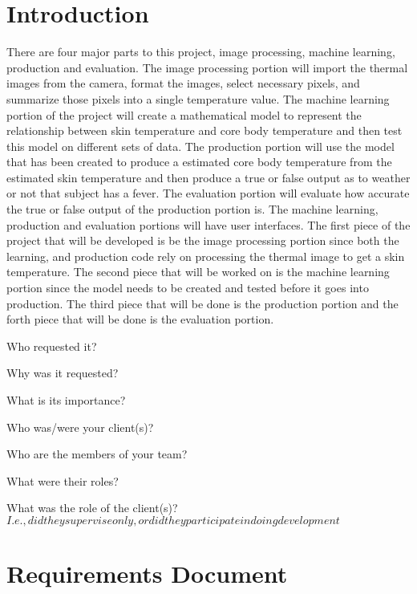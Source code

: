 \documentclass[onecolumn, draftclsnofoot,10pt, compsoc]{IEEEtran}
\begin{document}
\newpage
{}
\tableofcontents
	\clearpage

	\section{Introduction}
	
	There are four major parts to this project, image processing, machine learning, production and evaluation. The image processing portion will import the thermal images from the camera, format the images, select necessary pixels, and summarize those pixels into a single temperature value. The machine learning portion of the project will create a mathematical model to represent the relationship between skin temperature and core body temperature and then test this model on different sets of data. The production portion will use the model that has been created to produce a estimated core body temperature from the estimated skin temperature and then produce a true or false output as to weather or not that subject has a fever. The evaluation portion will evaluate how accurate the true or false output of the production portion is. The machine learning, production and evaluation portions will have user interfaces. The first piece of the project that will be developed is be the image processing portion since both the learning, and production code rely on processing the thermal image to get a skin temperature. The second piece that will be worked on is the machine learning portion since the model needs to be created and tested before it goes into production. The third piece that will be done is the production portion and the forth piece that will be done is the evaluation portion.
	
	Who requested it?
	
	Why was it requested?
	
	What is its importance?
	
	Who was/were your client(s)?
	
	Who are the members of your team?
	
	What were their roles?
	
	What was the role of the client(s)? \(I.e., did they supervise only, or did 
	they participate in doing development\)
	
	
	\section{Requirements Document}
\end{document}
